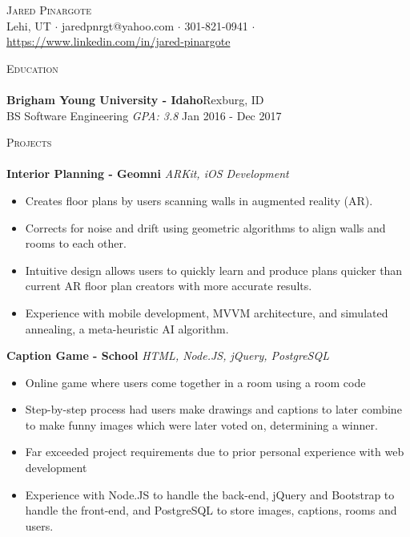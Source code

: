 \documentclass[a4paper]{article}
\newcommand{\lineunder} {
    \vspace*{-8pt} \\
    \hspace*{-18pt} \hrulefill \\
}
\newcommand{\header} [1] {
    {\hspace*{-18pt}\vspace*{6pt} \textsc{#1}}
    \vspace*{-6pt} \lineunder
}
\begin{document}
\vspace*{-40pt}

    

\vspace*{-10pt}
\begin{center}
    {\Huge \scshape {Jared Pinargote}}\\
    Lehi, UT $\cdot$ jaredpnrgt@yahoo.com $\cdot$ 301-821-0941 $\cdot$ \href{https://www.linkedin.com/in/jared-pinargote}{https://www.linkedin.com/in/jared-pinargote}
\end{center}

\header{Education}
\textbf{Brigham Young University - Idaho}\hfill Rexburg, ID\\
BS Software Engineering \textit{GPA: 3.8} \hfill Jan 2016 - Dec 2017\\
\vspace{2mm}

\header{Projects}
{\textbf{Interior Planning - Geomni}} {\sl ARKit, iOS Development} \\
\vspace{-3mm}
\begin{itemize} \itemsep 1pt
    \item Creates floor plans by users scanning walls in augmented reality (AR).
    \item Corrects for noise and drift using geometric algorithms to align walls and rooms to each other.
    \item Intuitive design allows users to quickly learn and produce plans quicker than current AR floor plan creators with more accurate results.
    \item Experience with mobile development, MVVM architecture, and simulated annealing, a meta-heuristic AI algorithm.
\end{itemize}

{\textbf{Caption Game - School}} {\sl HTML, Node.JS, jQuery, PostgreSQL} \\
\vspace{-3mm}
\begin{itemize} \itemsep 1pt
    \item Online game where users come together in a room using a room code
    \item Step-by-step process had users make drawings and captions to later combine to make funny images which were later voted on, determining a winner.
    \item Far exceeded project requirements due to prior personal experience with web development
    \item Experience with Node.JS to handle the back-end, jQuery and Bootstrap to handle the front-end, and PostgreSQL to store images, captions, rooms and users.
\end{itemize}
\end{document}
